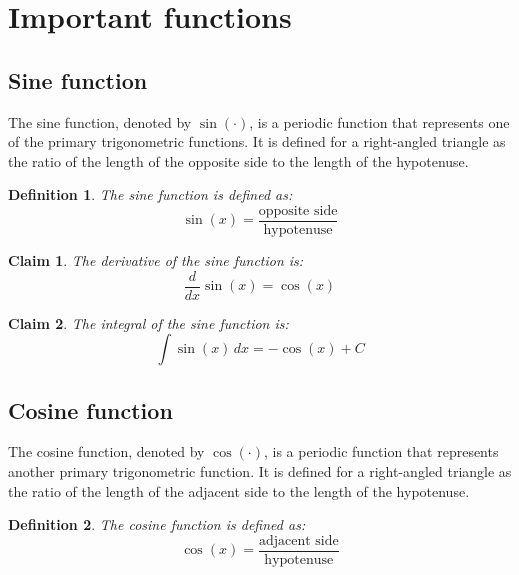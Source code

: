 \documentclass[11pt]{book} %
\newtheorem{definition}{Definition}[section]
\newtheorem*{claim*}{Claim}
\begin{document}
\section{Important functions}

\subsection{Sine function}
The sine function, denoted by \(\sin(\cdot)\), is a periodic function that represents one of the primary trigonometric functions.
It is defined for a right-angled triangle as the ratio of the length of the opposite side to the length of the hypotenuse.

\begin{definition}
    The sine function is defined as:
    \begin{equation}
        \sin(x) = \frac{\text{opposite side}}{\text{hypotenuse}}
    \end{equation}
\end{definition}

\begin{claim*}
    The derivative of the sine function is:
    \begin{equation}
        \frac{d}{dx} \sin(x) = \cos(x)
    \end{equation}
\end{claim*}

\begin{claim*}
    The integral of the sine function is:
    \begin{equation}
        \int \sin(x) \, dx = -\cos(x) + C
    \end{equation}
\end{claim*}


\subsection{Cosine function}
The cosine function, denoted by \(\cos(\cdot)\), is a periodic function that represents another primary trigonometric function.
It is defined for a right-angled triangle as the ratio of the length of the adjacent side to the length of the hypotenuse.

\begin{definition}
    The cosine function is defined as:
    \begin{equation}
        \cos(x) = \frac{\text{adjacent side}}{\text{hypotenuse}}
    \end{equation}
\end{definition}
\end{document}
